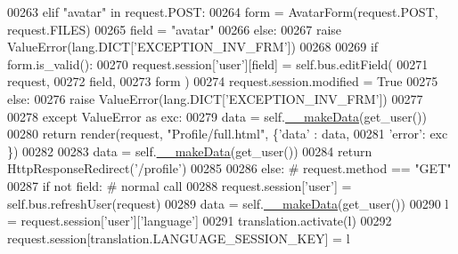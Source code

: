 \begin{DoxyCode}
00263                 \textcolor{keywordflow}{elif} \textcolor{stringliteral}{"avatar"} \textcolor{keywordflow}{in} request.POST:
00264                     form = AvatarForm(request.POST, request.FILES)
00265                     field = \textcolor{stringliteral}{"avatar"}
00266                 \textcolor{keywordflow}{else}:
00267                     \textcolor{keywordflow}{raise} ValueError(lang.DICT[\textcolor{stringliteral}{'EXCEPTION\_INV\_FRM'}])
00268 
00269                 \textcolor{keywordflow}{if} form.is\_valid():
00270                     request.session[\textcolor{stringliteral}{'user'}][field] = self.bus.editField(
00271                                                         request, 
00272                                                         field, 
00273                                                         form )
00274                     request.session.modified = \textcolor{keyword}{True}
00275                 \textcolor{keywordflow}{else}:
00276                     \textcolor{keywordflow}{raise} ValueError(lang.DICT[\textcolor{stringliteral}{'EXCEPTION\_INV\_FRM'}])
00277 
00278             \textcolor{keywordflow}{except} ValueError \textcolor{keyword}{as} exc:
00279                 data = self.\hyperlink{classProfile_1_1ProfileUnit_1_1UiFullProfile_a84f94d7278f7f4a452ac4701dc19b6a7}{\_\_makeData}(get\_user())
00280                 \textcolor{keywordflow}{return} render(request, \textcolor{stringliteral}{"Profile/full.html"}, \{\textcolor{stringliteral}{'data'} : data,
00281                                                              \textcolor{stringliteral}{'error'}: exc \})
00282 
00283             data = self.\hyperlink{classProfile_1_1ProfileUnit_1_1UiFullProfile_a84f94d7278f7f4a452ac4701dc19b6a7}{\_\_makeData}(get\_user())
00284             \textcolor{keywordflow}{return} HttpResponseRedirect(\textcolor{stringliteral}{'/profile'})
00285 
00286         \textcolor{keywordflow}{else}: \textcolor{comment}{# request.method == "GET"}
00287             \textcolor{keywordflow}{if} \textcolor{keywordflow}{not} field: \textcolor{comment}{# normal call}
00288                 request.session[\textcolor{stringliteral}{'user'}] = self.bus.refreshUser(request)
00289                 data = self.\hyperlink{classProfile_1_1ProfileUnit_1_1UiFullProfile_a84f94d7278f7f4a452ac4701dc19b6a7}{\_\_makeData}(get\_user())
00290                 l = request.session[\textcolor{stringliteral}{'user'}][\textcolor{stringliteral}{'language'}]
00291                 translation.activate(l)
00292                 request.session[translation.LANGUAGE\_SESSION\_KEY] = l

\end{DoxyCode}

